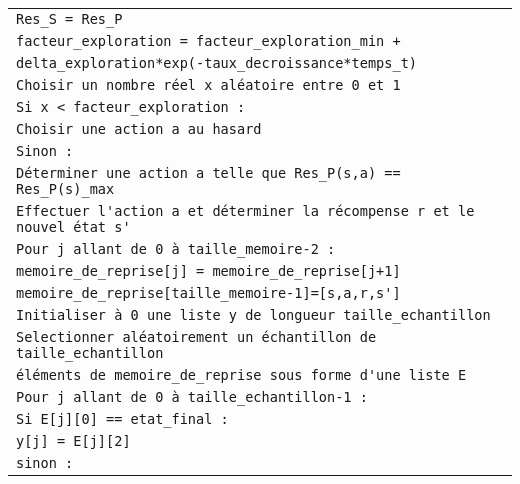 \begin{tabular}{|l|}
	\hspace{1.5cm} \verb|Res_S = Res_P| \\
	\hspace{1cm} \verb|facteur_exploration = facteur_exploration_min +| \\
	\hfill \verb|delta_exploration*exp(-taux_decroissance*temps_t)| \\
	\hspace{1cm} \verb|Choisir un nombre réel x aléatoire entre 0 et 1| \\
	\hspace{1cm} \verb|Si x < facteur_exploration :| \\
	\hspace{1.5cm} \verb|Choisir une action a au hasard| \\
	\hspace{1cm} \verb|Sinon :| \\
	\hspace{1.5cm} \verb|Déterminer une action a telle que Res_P(s,a) == Res_P(s)_max| \\
	\hspace{1cm} \verb|Effectuer l'action a et déterminer la récompense r et le nouvel état s'| \\ 
	\hspace{1cm} \verb|Pour j allant de 0 à taille_memoire-2 :| \\
	\hspace{1.5cm} \verb|memoire_de_reprise[j] = memoire_de_reprise[j+1]| \\
	\hspace{1cm} \verb|memoire_de_reprise[taille_memoire-1]=[s,a,r,s']| \\
	\hspace{1cm} \verb|Initialiser à 0 une liste y de longueur taille_echantillon|\\
	\hspace{1cm} \verb|Selectionner aléatoirement un échantillon de taille_echantillon| \\
	\hfill \verb|éléments de memoire_de_reprise sous forme d'une liste E| \\
	\hspace{1cm} \verb|Pour j allant de 0 à taille_echantillon-1 :|\\
	\hspace{1.5cm} \verb|Si E[j][0] == etat_final :| \\
	\hspace{2cm} \verb|y[j] = E[j][2]| \\
	\hspace{1.5cm} \verb|sinon :| \\

\end{tabular}
